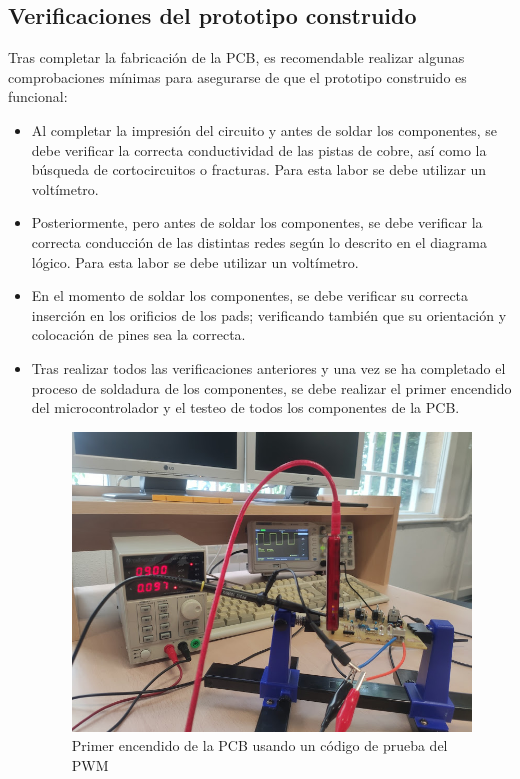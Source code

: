 \subsection{Verificaciones del prototipo construido}

Tras completar la fabricación de la \ac{PCB}, es recomendable realizar algunas comprobaciones mínimas para asegurarse de que el prototipo construido es funcional:

\begin{itemize}
    \item Al completar la impresión del circuito y antes de soldar los componentes, se debe verificar la correcta conductividad de las pistas de cobre, así como la búsqueda de cortocircuitos o fracturas. Para esta labor se debe utilizar un voltímetro.
    
    \item  Posteriormente, pero antes de soldar los componentes, se debe verificar la correcta conducción de las distintas redes según lo descrito en el diagrama lógico. Para esta labor se debe utilizar un voltímetro.
    
    \item En el momento de soldar los componentes, se debe verificar su correcta inserción en los orificios de los pads; verificando también que su orientación y colocación de pines sea la correcta.
    
    \item Tras realizar todos las verificaciones anteriores y una vez se ha completado el proceso de soldadura de los componentes, se debe realizar el primer encendido del microcontrolador y el testeo de todos los componentes de la \ac{PCB}.
    
        
    \begin{figure}[H]
    \centering 
    \includegraphics[width=0.55\linewidth]{pictures/PrimerEncendido.jpg}
    \caption{Primer encendido de la \ac{PCB} usando un código de prueba del PWM}
    \label{fig:kdiagram}
    \end{figure}
    

\end{itemize}
